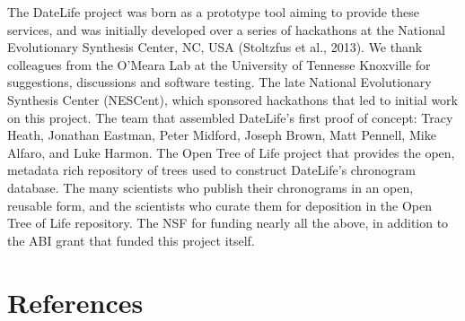 \documentclass[
  english,
  man]{apa6}
\begin{document}
The DateLife project was born as a prototype tool aiming to provide these services, and was initially developed over a series of hackathons at the National Evolutionary Synthesis Center, NC, USA (Stoltzfus et al., 2013).
We thank colleagues from the O'Meara Lab at the University
of Tennesse Knoxville for suggestions, discussions and software testing.
The late National Evolutionary Synthesis Center (NESCent), which sponsored hackathons
that led to initial work on this project. The team that assembled DateLife's first proof of concept: Tracy Heath, Jonathan Eastman, Peter Midford, Joseph Brown, Matt Pennell, Mike Alfaro, and Luke Harmon.
The Open Tree of Life project that provides the open, metadata rich repository of
trees used to construct DateLife's chronogram database.
The many scientists who publish their chronograms in an open, reusable form, and the scientists who curate them for deposition in the Open Tree of Life repository.
The NSF for funding nearly all the above, in addition to the ABI grant that funded this project itself.

\newpage

\hypertarget{references}{%
\section{References}\label{references}}

\begingroup
\setlength{\parindent}{-0.5in}
\setlength{\leftskip}{0.5in}
\end{document}
